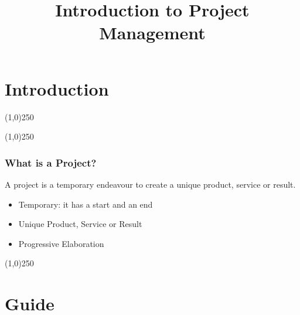 



%
\title[Project Management \& BIM]{Introduction to Project Management}



%
\usetikzlibrary{arrows}



\newpage




\thispagestyle{empty}
\tableofcontents
\newpage
\section{Introduction}


\begin{frame}
\titlepage
\end{frame}\begin{center}\line(1,0){250}\end{center}
%
%
\begin{center}\line(1,0){250}\end{center}



\begin{frame}
\frametitle{What is a Project?}
A project is a temporary endeavour to create a unique product, service or result.\\
\begin{itemize}
\item Temporary: it has a start and an end
\item Unique Product, Service or Result
\item Progressive Elaboration
\end{itemize}
\end{frame}
\begin{center}\line(1,0){250}\end{center}









\section{Guide}


